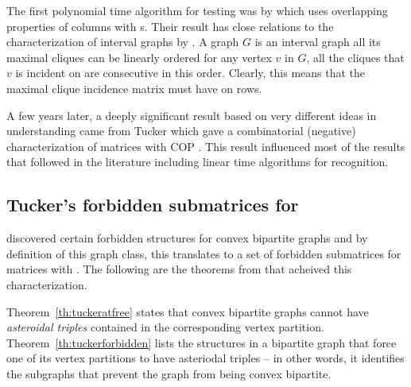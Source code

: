The first polynomial time algorithm for \COP testing was by
\cite{fg65} which uses overlapping properties of columns with \un
s. Their result has close relations to the characterization of
interval graphs by \cite{gh64}. A graph $G$ is an interval graph \iff
all its maximal cliques can be linearly ordered \stt for any vertex
$v$ in $G$, all the cliques that $v$ is incident on are consecutive in
this order. Clearly, this means that the maximal clique incidence
matrix must
have \COP on rows.

A few years later, a deeply significant result based on very different
ideas in understanding \COP came from Tucker which gave a
combinatorial (negative) characterization of matrices with COP
\cite{at72}. This result influenced most of the \COP results that
followed in the literature including linear time
algorithms for \COP
recognition.


\subsection{Tucker's forbidden submatrices for \COP}


\cite{at72} discovered certain forbidden structures for convex
bipartite graphs and by definition of this graph
class, this translates to a set of forbidden submatrices for matrices
with \cop.  The following are the theorems from \cite{at72} that
acheived this characterization.


Theorem~\ref{th:tuckeratfree} states that convex bipartite graphs
cannot have {\em asteroidal triples} contained in the corresponding vertex
partition.
Theorem~\ref{th:tuckerforbidden} lists the structures in a
bipartite graph that force one of its vertex partitions to have
asteriodal triples -- in other words, it identifies the subgraphs that
prevent the graph from being convex bipartite.


